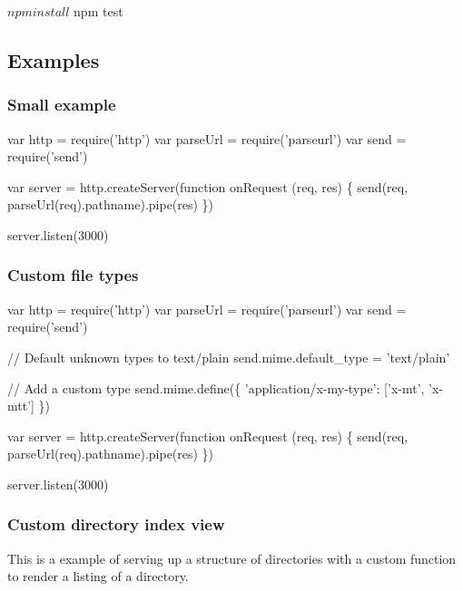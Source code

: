 \begin{DoxyCode}
$ npm install
$ npm test
\end{DoxyCode}


\subsection*{Examples}

\subsubsection*{Small example}


\begin{DoxyCode}
var http = require('http')
var parseUrl = require('parseurl')
var send = require('send')

var server = http.createServer(function onRequest (req, res) \{
  send(req, parseUrl(req).pathname).pipe(res)
\})

server.listen(3000)
\end{DoxyCode}


\subsubsection*{Custom file types}


\begin{DoxyCode}
var http = require('http')
var parseUrl = require('parseurl')
var send = require('send')

// Default unknown types to text/plain
send.mime.default\_type = 'text/plain'

// Add a custom type
send.mime.define(\{
  'application/x-my-type': ['x-mt', 'x-mtt']
\})

var server = http.createServer(function onRequest (req, res) \{
  send(req, parseUrl(req).pathname).pipe(res)
\})

server.listen(3000)
\end{DoxyCode}


\subsubsection*{Custom directory index view}

This is a example of serving up a structure of directories with a custom function to render a listing of a directory.


